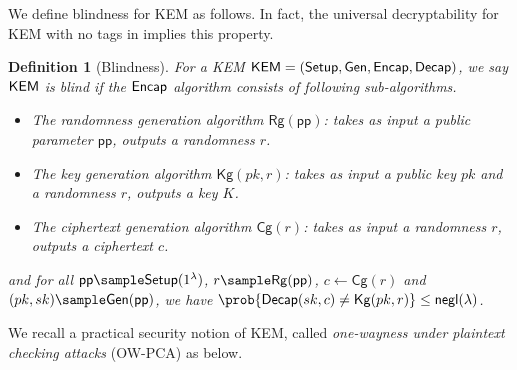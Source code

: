 \documentclass[a4paper,11pt]{article}
\newtheorem{defn}{Definition}[]
\newcommand{\negli}{\mathsf{negl}}
\begin{document}
\begin{sloppypar}
\smallskip
We define blindness for KEM as follows. In fact, the universal decryptability for KEM with no tags in \cite{AC:CheHuaYun20} implies this property.

\begin{defn}[Blindness]
     For a KEM ${\sf KEM}=({\sf Setup}, {\sf Gen}, {\sf Encap}, {\sf Decap})$, we say ${\sf KEM}$ is blind if the ${\sf Encap}$ algorithm consists of following sub-algorithms.
     \begin{itemize}[itemsep=0pt, topsep=0pt, parsep=0pt]
        \item The randomness generation algorithm $\mathsf{Rg}(\mathsf{pp})$: takes as input a public parameter $\mathsf{pp}$, {outputs} a randomness $r$.
        \item The key generation algorithm $\mathsf{Kg}(pk,r)$: takes as input a public key $pk$ and a randomness $r$, outputs a key $K$.
        \item The ciphertext generation algorithm $\mathsf{Cg}(r)$: takes as input a randomness $r$, outputs a ciphertext $c$.
     \end{itemize}
     and for all $\mathsf{pp}\sample \mathsf{Setup}(1^{\lambda})$, $r\sample \mathsf{Rg}(\mathsf{pp})$, $c\gets \mathsf{Cg}(r)$ and $(pk,sk)\sample\mathsf{Gen}(\mathsf{pp})$, we have $\prob{\mathsf{Decap}(sk,c) \neq \mathsf{Kg}(pk,r)}\leq\negli(\lambda)$.
 \end{defn}

We recall a practical security notion of KEM, called {\it one-wayness under plaintext checking attacks} (OW-PCA) \cite{ACISP:SteBaeZhe02} as below. %


\end{sloppypar}
\end{document}
